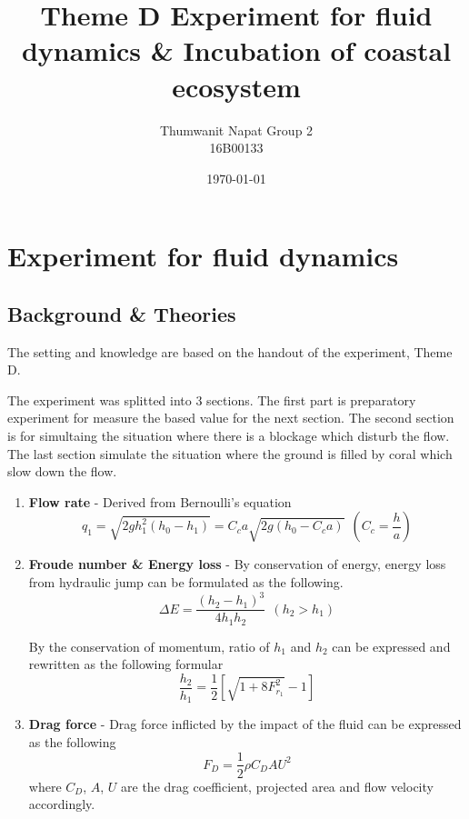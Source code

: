 \documentclass[a4paper]{report}
\title{Theme D Experiment for fluid dynamics \& Incubation of coastal ecosystem}
\author{Thumwanit Napat Group 2 \\ 16B00133}
\date{\today}
\begin{document}
\nocite{*}
\maketitle

\chapter{Experiment for fluid dynamics}
\label{sec:firstExperiment}

\section{Background \& Theories}
The setting and knowledge are based on the handout of the experiment, Theme D.

The experiment was splitted into 3 sections. The first part is preparatory experiment for measure the
based value for the next section. The second section is for simultaing the situation where there is a blockage which disturb the
flow. The last section simulate the situation where the ground is filled by coral which slow down the flow.
\begin{enumerate}
    \item {\bf Flow rate} - Derived from Bernoulli's equation
    \begin{equation}\label{eq:flow_rate}
        q_1=\sqrt{2gh_1^2(h_0-h_1)}=C_ca\sqrt{2g(h_0-C_ca)} \ \ \left(C_c=\frac{h}{a}\right)    
    \end{equation}
    
    
    \item {\bf Froude number \& Energy loss} - 
    By conservation of energy, energy loss from hydraulic jump can be formulated as the following.
    \begin{equation}\label{eq:enegy}
        \Delta E = \frac{(h_2-h_1)^3}{4h_1h_2} \ \ (h_2 > h_1)
    \end{equation}

    By the conservation of momentum, ratio of $h_1$ and $h_2$ can be expressed and rewritten as the following formular
    \begin{equation}\label{eq:froude}
        \frac{h_2}{h_1}=\frac{1}{2}\left[\sqrt{1+8F_{r_1}^2}-1\right]
    \end{equation}
    
    \item {\bf Drag force} - Drag force inflicted by the impact of the fluid can be expressed as the following
    \begin{equation}\label{eq:drag}
        F_D=\frac{1}{2}\rho C_DAU^2
    \end{equation}
    where $C_D$, $A$, $U$ are the drag coefficient, projected area and flow velocity accordingly.
    
\end{enumerate}
\end{document}
